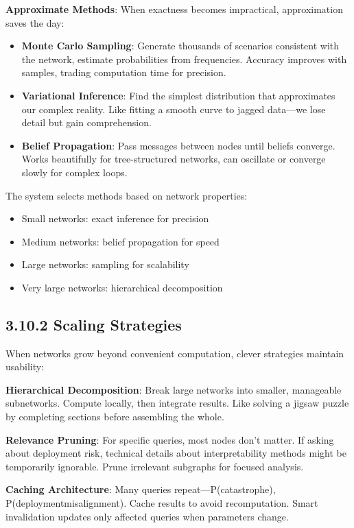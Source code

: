 \documentclass[
  11pt,
  letterpaper,
  openany]{book}
\providecommand{\tightlist}{%
  \setlength{\itemsep}{0pt}\setlength{\parskip}{0pt}}
\begin{document}
\textbf{Approximate Methods}: When exactness becomes impractical,
approximation saves the day:

\begin{itemize}
\tightlist
\item
  \textbf{Monte Carlo Sampling}: Generate thousands of scenarios
  consistent with the network, estimate probabilities from frequencies.
  Accuracy improves with samples, trading computation time for
  precision.
\item
  \textbf{Variational Inference}: Find the simplest distribution that
  approximates our complex reality. Like fitting a smooth curve to
  jagged data---we lose detail but gain comprehension.
\item
  \textbf{Belief Propagation}: Pass messages between nodes until beliefs
  converge. Works beautifully for tree-structured networks, can
  oscillate or converge slowly for complex loops.
\end{itemize}

The system selects methods based on network properties:

\begin{itemize}
\tightlist
\item
  Small networks: exact inference for precision
\item
  Medium networks: belief propagation for speed
\item
  Large networks: sampling for scalability
\item
  Very large networks: hierarchical decomposition
\end{itemize}

\subsection{3.10.2 Scaling Strategies}\label{sec-scaling-strategies}

When networks grow beyond convenient computation, clever strategies
maintain usability:

\textbf{Hierarchical Decomposition}: Break large networks into smaller,
manageable subnetworks. Compute locally, then integrate results. Like
solving a jigsaw puzzle by completing sections before assembling the
whole.

\textbf{Relevance Pruning}: For specific queries, most nodes don't
matter. If asking about deployment risk, technical details about
interpretability methods might be temporarily ignorable. Prune
irrelevant subgraphs for focused analysis.

\textbf{Caching Architecture}: Many queries repeat---P(catastrophe),
P(deployment\textbar misalignment). Cache results to avoid
recomputation. Smart invalidation updates only affected queries when
parameters change.
\end{document}
